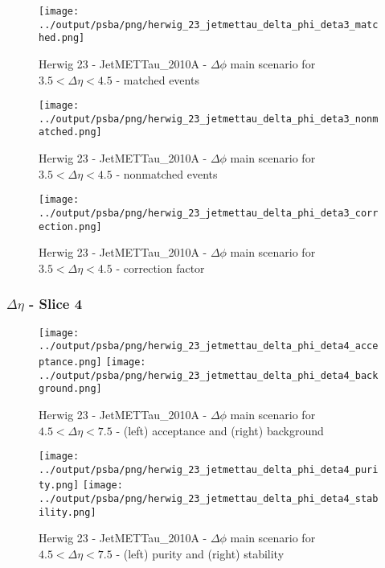 \documentclass[11pt]{book}
\begin{document}
\begin{figure}[ht]
\centering
\texttt{[image: ../output/psba/png/herwig\_23\_jetmettau\_delta\_phi\_deta3\_matched.png]}
\caption{Herwig 23 - JetMETTau\_2010A - $\Delta\phi$ main scenario for $3.5 < \Delta\eta < 4.5$ - matched events}
\label{fig:hw_23_jetmettau_delta_phi_deta3_matched}
\end{figure}

\begin{figure}[ht]
\centering
\texttt{[image: ../output/psba/png/herwig\_23\_jetmettau\_delta\_phi\_deta3\_nonmatched.png]}
\caption{Herwig 23 - JetMETTau\_2010A - $\Delta\phi$ main scenario for $3.5 < \Delta\eta < 4.5$ - nonmatched events}
\label{fig:hw_23_jetmettau_delta_phi_deta3_nonmatched}
\end{figure}

\begin{figure}[ht]
\centering
\texttt{[image: ../output/psba/png/herwig\_23\_jetmettau\_delta\_phi\_deta3\_correction.png]}
\caption{Herwig 23 - JetMETTau\_2010A - $\Delta\phi$ main scenario for $3.5 < \Delta\eta < 4.5$ - correction factor}
\label{fig:hw_23_jetmettau_delta_phi_deta3_correction}
\end{figure}

\clearpage
\subsubsection{$\Delta\eta$ - Slice 4}

\begin{figure}[ht]
\centering
\texttt{[image: ../output/psba/png/herwig\_23\_jetmettau\_delta\_phi\_deta4\_acceptance.png]}
\texttt{[image: ../output/psba/png/herwig\_23\_jetmettau\_delta\_phi\_deta4\_background.png]}
\caption{Herwig 23 - JetMETTau\_2010A - $\Delta\phi$ main scenario for $4.5 < \Delta\eta < 7.5$ - (left) acceptance and (right) background}
\label{fig:hw_23_jetmettau_delta_phi_deta4_ab}
\end{figure}

\begin{figure}[ht]
\centering
\texttt{[image: ../output/psba/png/herwig\_23\_jetmettau\_delta\_phi\_deta4\_purity.png]}
\texttt{[image: ../output/psba/png/herwig\_23\_jetmettau\_delta\_phi\_deta4\_stability.png]}
\caption{Herwig 23 - JetMETTau\_2010A - $\Delta\phi$ main scenario for $4.5 < \Delta\eta < 7.5$ - (left) purity and (right) stability}
\label{fig:hw_23_jetmettau_delta_phi_deta4_ps}
\end{figure}
\end{document}
